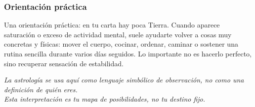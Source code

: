 \documentclass[11pt,a4paper]{article}\usepackage[utf8]{inputenc}
\begin{document}
\subsubsection*{Orientación práctica}
Una orientación práctica: en tu carta hay poca Tierra. Cuando aparece saturación o exceso de actividad mental, suele ayudarte volver a cosas muy concretas y físicas: mover el cuerpo, cocinar, ordenar, caminar o sostener una rutina sencilla durante varios días seguidos. Lo importante no es hacerlo perfecto, sino recuperar sensación de estabilidad.

\vspace{1cm}
\begin{center}
{\small\itshape\color{grisai}
La astrología se usa aquí como lenguaje simbólico de observación, no como una definición de quién eres.\\
Esta interpretación es tu mapa de posibilidades, no tu destino fijo.
}
\end{center}
\end{document}
